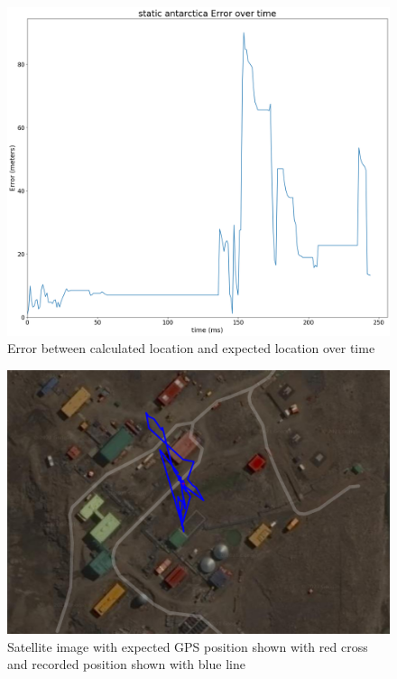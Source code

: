\begin{figure}[h]
    \begin{centering}
        \includegraphics[width=14cm,keepaspectratio]{Figures/2021_3_30_static_antarctica error over time.png}
        \caption{Error between calculated location and expected location over time}
        \label{fig:antarcticaStaticError}
    \end{centering}
\end{figure}

\begin{figure}[h]
    \begin{centering}
        \includegraphics[width=14cm,keepaspectratio]{Figures/2021_3_30_static_antarctica_Satellite.PNG}
        \caption{Satellite image with expected GPS position shown with red cross and recorded position shown with blue line}
        \label{fig:antarcticaSatelliteImage}
    \end{centering}
\end{figure}

